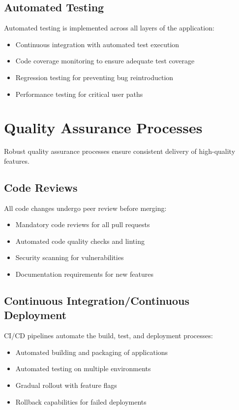 \documentclass[12pt,a4paper]{report}
\begin{document}
\subsection{Automated Testing}
Automated testing is implemented across all layers of the application:
\begin{itemize}[leftmargin=2em]
  \item Continuous integration with automated test execution
  \item Code coverage monitoring to ensure adequate test coverage
  \item Regression testing for preventing bug reintroduction
  \item Performance testing for critical user paths
\end{itemize}

\section{Quality Assurance Processes}
Robust quality assurance processes ensure consistent delivery of high-quality features.

\subsection{Code Reviews}
All code changes undergo peer review before merging:
\begin{itemize}[leftmargin=2em]
  \item Mandatory code reviews for all pull requests
  \item Automated code quality checks and linting
  \item Security scanning for vulnerabilities
  \item Documentation requirements for new features
\end{itemize}

\subsection{Continuous Integration/Continuous Deployment}
CI/CD pipelines automate the build, test, and deployment processes:
\begin{itemize}[leftmargin=2em]
  \item Automated building and packaging of applications
  \item Automated testing on multiple environments
  \item Gradual rollout with feature flags
  \item Rollback capabilities for failed deployments
\end{itemize}
\end{document}
